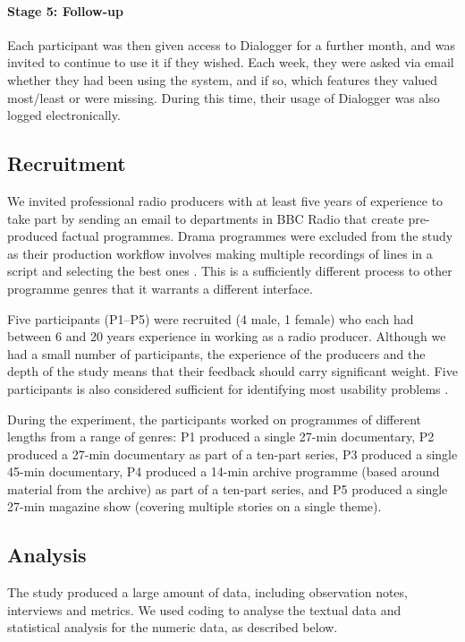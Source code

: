 \paragraph{Stage 5: Follow-up}
    Each participant was then given access to Dialogger for a further month, and was invited to continue to use it if
    they wished. Each week, they were asked via email whether they had been using the system, and if so, which features
    they valued most/least or were missing.  During this time, their usage of Dialogger was also logged electronically.

\subsection{Recruitment}
We invited professional radio producers with at least five years of experience to take part
by sending an email to departments in BBC Radio that create pre-produced
factual programmes.  Drama programmes were excluded from the study as their
production workflow involves making multiple recordings of lines in a script
and selecting the best ones \citep{Baume2015}. This is a sufficiently different
process to other programme genres that it warrants a different interface.

Five participants (P1--P5) were recruited (4 male, 1 female) who each had
between 6 and 20 years experience in working as a radio producer. Although we
had a small number of participants, the experience of the
producers and the depth of the study means that their feedback should carry
significant weight. Five participants is also considered sufficient for
identifying most usability problems \citep{Nielsen1993}.

During the experiment, the participants worked on programmes of different
lengths from a range of genres:
P1 produced a single 27-min documentary, %
P2 produced a 27-min documentary as part of a ten-part series,
P3 produced a single 45-min documentary,
P4 produced a 14-min archive programme
(based around material from the archive) as part of a ten-part series, and
P5 produced a single 27-min magazine show (covering multiple stories on a
single theme).

\subsection{Analysis}
The study produced a large amount of data, including observation notes, interviews and metrics. We used coding to
analyse the textual data and statistical analysis for the numeric data, as described below.

